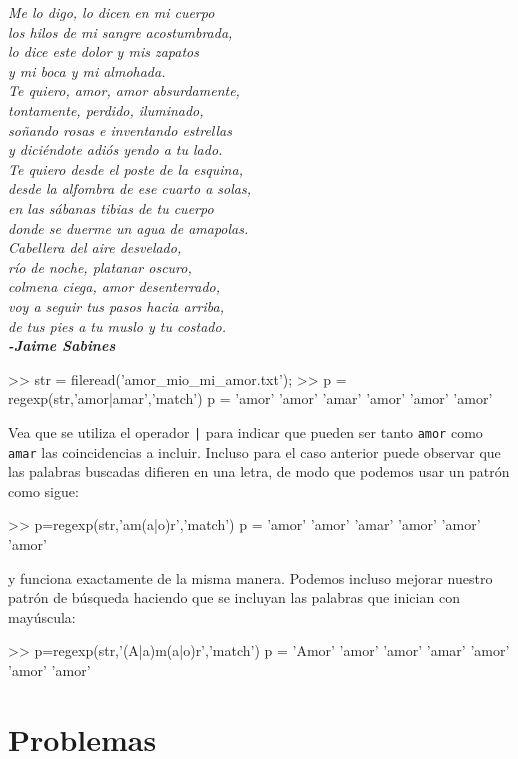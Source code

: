 \emph{Me lo digo, lo dicen en mi cuerpo}\\
\emph{los hilos de mi sangre acostumbrada,}\\
\emph{lo dice este dolor y mis zapatos}\\
\emph{y mi boca y mi almohada.} \\ 

\emph{Te quiero, amor, amor absurdamente,}\\
\emph{tontamente, perdido, iluminado,}\\
\emph{soñando rosas e inventando estrellas}\\
\emph{y diciéndote adiós yendo a tu lado.} \\

\emph{Te quiero desde el poste de la esquina,}\\
\emph{desde la alfombra de ese cuarto a solas,}\\
\emph{en las sábanas tibias de tu cuerpo}\\
\emph{donde se duerme un agua de amapolas.} \\

\emph{Cabellera del aire desvelado,}\\
\emph{río de noche, platanar oscuro,}\\
\emph{colmena ciega, amor desenterrado,}\\
\emph{voy a seguir tus pasos hacia arriba,}\\
\emph{de tus pies a tu muslo y tu costado.}\\

{\bf\it -Jaime Sabines}

\begin{matlab}
>> str = fileread('amor_mio_mi_amor.txt');
>> p = regexp(str,'amor|amar','match')
p = 
    'amor'    'amor'    'amar'    'amor'    'amor'    'amor'
\end{matlab}

Vea que se utiliza el operador \texttt{|} para indicar que
pueden ser tanto \texttt{amor} como \texttt{amar} las coincidencias a
incluir. Incluso para el caso anterior puede observar que las palabras
buscadas difieren en una letra, de modo que podemos usar un patrón como
sigue:

\begin{matlab}
>> p=regexp(str,'am(a|o)r','match')
p = 
    'amor'    'amor'    'amar'    'amor'    'amor'    'amor'
\end{matlab}

y funciona exactamente de la misma manera. Podemos incluso mejorar
nuestro patrón de búsqueda haciendo que se incluyan las palabras que
inician con mayúscula:

\begin{matlab}
>> p=regexp(str,'(A|a)m(a|o)r','match')
p = 
    'Amor'    'amor'    'amor'    'amar'    'amor'    'amor'    'amor'
\end{matlab}


\section*{Problemas}
